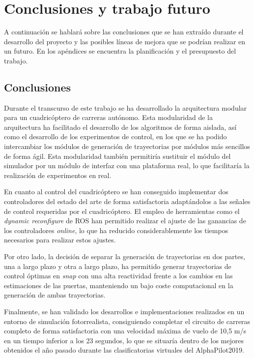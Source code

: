 \chapter{Conclusiones y trabajo futuro}

 A continuación se hablará sobre las conclusiones que se han extraído durante el desarrollo del proyecto y las posibles líneas de mejora que se podrían realizar en un futuro. En los apéndices se encuentra la planificación y el presupuesto del trabajo. 


\section{Conclusiones}

Durante el transcurso de este trabajo se ha desarrollado la arquitectura modular para un cuadricóptero de carreras autónomo. Esta modularidad de la arquitectura ha facilitado el desarrollo de los algoritmos de forma aislada, así como el desarrollo de los experimentos de control, en los que se ha podido intercambiar los módulos de generación de trayectorias por módulos más sencillos de forma ágil. Esta modularidad también permitiría sustituir el módulo del simulador por un módulo de interfaz con una plataforma real, lo que facilitaría la realización de experimentos en real.

En cuanto al control del cuadricóptero se han conseguido implementar dos controladores del estado del arte de forma satisfactoria adaptándolos a las señales de control requeridas por el cuadricóptero. El empleo de herramientas como el \textit{dynamic reconfigure} de ROS han permitido realizar el ajuste de las ganancias de los controladores \textit{online}, lo que ha reducido considerablemente los tiempos necesarios para realizar estos ajustes.

Por otro lado, la decisión de separar la generación de trayectorias en dos partes, una a largo plazo y otra a largo plazo, ha permitido generar trayectorias de control óptimas en \textit{snap} con una alta reactividad frente a los cambios en las estimaciones de las puertas, manteniendo un bajo coste computacional en la generación de ambas trayectorias.

Finalmente, se han validado los desarrollos e implementaciones realizados en un entorno de simulación fotorrealista, consiguiendo completar el circuito de carreras completo de forma satisfactoria con una velocidad máxima de vuelo de 10,5 m/s en un tiempo inferior a los 23 segundos, lo que se situaría dentro de los mejores obtenidos el año pasado durante las clasificatorias virtuales del AlphaPilot2019.



